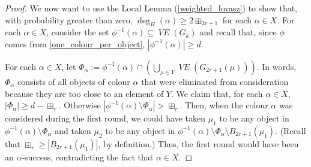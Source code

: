\documentclass{patmorin}
\newcommand{\vol}[1]{\boxplus_{#1}}
\DeclareMathOperator{\VE}{\mathit{VE}}
\begin{document}
\begin{proof}
  We now want to use the Local Lemma (\cref{weighted_lovasz}) to show that, with probability greater than zero, $\deg_H(\alpha)\ge 2\vol{2r+1}$ for each $\alpha\in X$.  For each $\alpha\in X$, consider the set $\phi^{-1}(\alpha)\subseteq \VE(G_k)$ and recall that, since $\phi$ comes from \cref{one_colour_per_object}, $|\phi^{-1}(\alpha)| \ge d$.

  For each $\alpha\in X$, let $\Phi_\alpha:=\phi^{-1}(\alpha)\cap \left(\bigcup_{\mu\in Y}\VE(G_{2r+1}(\mu))\right)$.  In words, $\Phi_\alpha$ consists of all objects of colour $\alpha$ that were eliminated from consideration because they are too close to an element of $Y$. We claim that, for each $\alpha\in X$, $|\Phi_\alpha|\ge d-\vol{r}$.  Otherwise $|\phi^{-1}(\alpha)\setminus\Phi_\alpha| > \vol{r}$. Then, when the colour $\alpha$ was considered during the first round, we could have taken $\mu_1$ to be any object in $\phi^{-1}(\alpha)\setminus\Phi_\alpha$ and taken $\mu_2$ to be any object in $\phi^{-1}(\alpha)\setminus\Phi_\alpha\setminus B_{2r+1}(\mu_1)$. (Recall that $\vol{r}\ge |B_{2r+1}(\mu_1)|$, by definition.)  Thus, the first round would have been an $\alpha$-success, contradicting the fact that $\alpha\in X$.




\end{proof}
\end{document}
